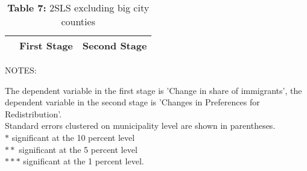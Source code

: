 \documentclass[12pt,a4paper]{standalone}
\newcommand\tab[1][1cm]{\hspace*{#1}}
\newcommand\tabs[1][0.8cm]{\hspace*{#1}}
\newcommand\tabu[1][0.4cm]{\hspace*{#1}}
\begin{document}
\begin{minipage}[c][24cm]{1.3 \textwidth}

\thispagestyle{empty}

\begin{table}
\centering
\caption*{\textbf{Table 7:} 2SLS excluding big city counties}

\begin{threeparttable}
\begin{tabular}{lll}

    \toprule

    & First Stage & Second Stage  \\ 
    \midrule
 

    \bottomrule
\end{tabular}

    \begin{tablenotes}
    \item NOTES:
	\par
	\begingroup
	\leftskip=0.3cm %
	\noindent 
	The dependent variable in the first stage is 				'Change in share of immigrants', the dependent 				variable in the second stage is 'Changes in 				Preferences for Redistribution'. \\
    Standard errors clustered on municipality level are 		shown in parentheses. \\
    $ \ast $ \tab significant at the 10 percent level \\
    $ \ast \ast $ \tabs significant at the 5 percent level 	\\
    $ \ast \ast \ast $ \tabu significant at the 1 percent 		level.
	\par
	\endgroup




    \end{tablenotes}
\end{threeparttable}
\end{table}

\end{minipage}
\end{document}
